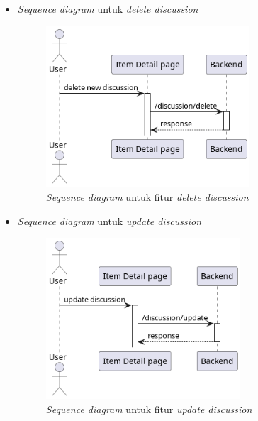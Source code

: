 \documentclass[a4paper]{article}
\begin{document}
\begin{enumerate}
\begin{enumerate}
\begin{itemize}
            \newpage
            \item \textit{Sequence diagram} untuk \textit{delete discussion}
            \begin{figure}[h]
                \centering
                \includegraphics*[height=6cm]{diagram/sequence diagram/FE/14. discussion/delete discussion/create discussion.png}
                \caption{\textit{Sequence diagram} untuk fitur \textit{delete discussion}}
            \end{figure}

            \item \textit{Sequence diagram} untuk \textit{update discussion}
            \begin{figure}[h]
                \centering
                \includegraphics*[height=6cm]{diagram/sequence diagram/FE/14. discussion/update discussion/update discussion.png}
                \caption{\textit{Sequence diagram} untuk fitur \textit{update discussion}}
            \end{figure}


\end{itemize}
\end{enumerate}
\end{enumerate}
\end{document}
